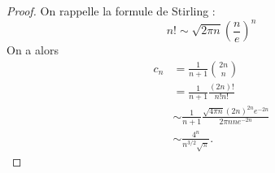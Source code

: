 \documentclass[../main.tex]{subfiles}
\begin{document}
\begin{proof}
    On rappelle la formule de Stirling :
    \begin{equation}
        n! \sim \sqrt{2\pi n}\left(\frac{n}{e}\right)^n
    \end{equation}
    On a alors 
    \begin{align}
        c_n & = \frac{1}{n+1}\binom{2n}{n}\\
        & = \frac{1}{n+1}\frac{(2n)!}{n!n!}\\
        & \sim \frac{1}{n+1}\frac{\sqrt{4\pi n}(2n)^{2n}e^{-2n}}{2\pi n n e^{-2n}}\\
        & \sim \frac{4^n}{n^{3/2}\sqrt{\pi}}.
    \end{align}
\end{proof}
\end{document}
